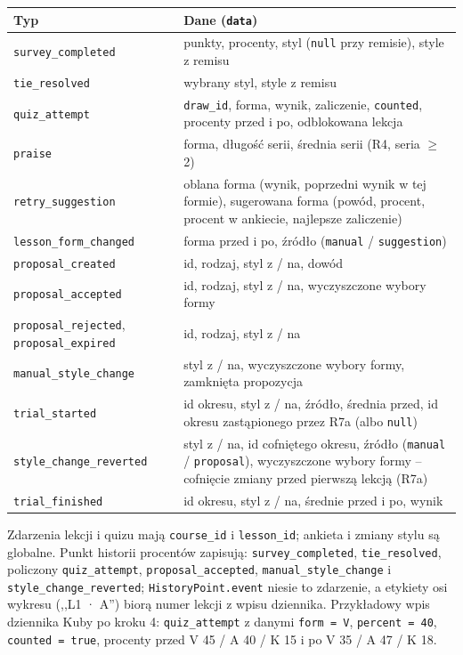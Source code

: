 \begingroup
\small
\begin{longtable}{p{4.3cm} p{10.4cm}}
\toprule
\textbf{Typ} & \textbf{Dane (\texttt{data})} \\
\midrule
\endhead
\texttt{survey\_completed} & punkty, procenty, styl (\texttt{null} przy remisie), style z remisu \\
\texttt{tie\_resolved} & wybrany styl, style z remisu \\
\texttt{quiz\_attempt} & \texttt{draw\_id}, forma, wynik, zaliczenie, \texttt{counted}, procenty przed i po, odblokowana lekcja \\
\texttt{praise} & forma, długość serii, średnia serii (R4, seria $\geq$ 2) \\
\texttt{retry\_suggestion} & oblana forma (wynik, poprzedni wynik w tej formie), sugerowana forma (powód, procent, procent w ankiecie, najlepsze zaliczenie) \\
\texttt{lesson\_form\_changed} & forma przed i po, źródło (\texttt{manual} / \texttt{suggestion}) \\
\texttt{proposal\_created} & id, rodzaj, styl z / na, dowód \\
\texttt{proposal\_accepted} & id, rodzaj, styl z / na, wyczyszczone wybory formy \\
\texttt{proposal\_rejected}, \texttt{proposal\_expired} & id, rodzaj, styl z / na \\
\texttt{manual\_style\_change} & styl z / na, wyczyszczone wybory formy, zamknięta propozycja \\
\texttt{trial\_started} & id okresu, styl z / na, źródło, średnia przed, id okresu zastąpionego przez R7a (albo \texttt{null}) \\
\texttt{style\_change\_reverted} & styl z / na, id cofniętego okresu, źródło (\texttt{manual} / \texttt{proposal}), wyczyszczone wybory formy -- cofnięcie zmiany przed pierwszą lekcją (R7a) \\
\texttt{trial\_finished} & id okresu, styl z / na, średnie przed i po, wynik \\
\bottomrule
\end{longtable}
\endgroup

Zdarzenia lekcji i quizu mają \texttt{course\_id} i \texttt{lesson\_id}; ankieta i zmiany stylu są globalne. Punkt historii procentów zapisują: \texttt{survey\_completed}, \texttt{tie\_resolved}, policzony \texttt{quiz\_attempt}, \texttt{proposal\_accepted}, \texttt{manual\_style\_change} i \texttt{style\_change\_reverted}; \texttt{HistoryPoint.event} niesie to zdarzenie, a etykiety osi wykresu (,,L1 · A'') biorą numer lekcji z wpisu dziennika. Przykładowy wpis dziennika Kuby po kroku 4: \texttt{quiz\_attempt} z danymi \texttt{form = V}, \texttt{percent = 40}, \texttt{counted = true}, procenty przed V 45 / A 40 / K 15 i po V 35 / A 47 / K 18.
